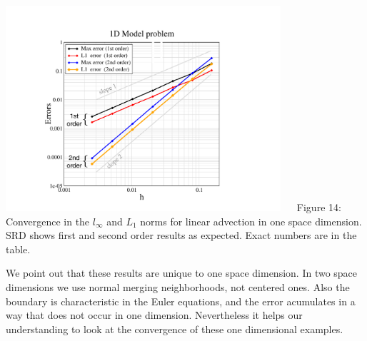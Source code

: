 \begin{minipage}[t][4.in][t]{3.in}
\includegraphics[height=3.0in]{figs/1dconvModel.pdf}
$\quad$ Figure 14: {\sf  Convergence in the $l_{\infty}$ and  $L_1$ norms 
for linear advection in one space dimension. 
SRD shows first and second order results as expected.  Exact numbers are in the table.
\label{fig:1dconv}}
\end{minipage}

We point out that these results are unique to one space dimension.
In two space dimensions we use normal merging neighborhoods, not
centered ones. Also the boundary is characteristic in the Euler
equations, and the error acumulates in a way that
does not occur in one dimension. Nevertheless it helps our
understanding to look at the convergence of these one dimensional examples. 
